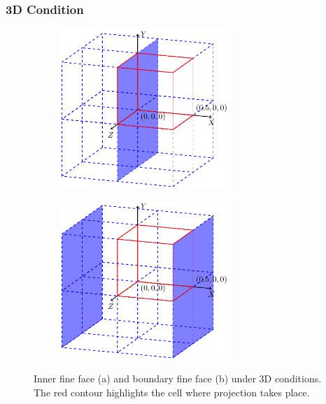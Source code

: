 \subsubsection{3D Condition}
\begin{figure}[ht]
    \centering
    \begin{subfigure}[b]{0.45\textwidth}
        \centering
        \includegraphics[height=6cm]{./image/embed-tree-h/fs_3D3.pdf}
        \subcaption{}
        \label{fig:embed-tree-3Dinner}
    \end{subfigure}
    \begin{subfigure}[b]{0.45\textwidth}
        \centering
        \includegraphics[height=6cm]{./image/embed-tree-h/fs_3D4.pdf}
        \subcaption{}
        \label{fig:embed-tree-3Dboundary}
    \end{subfigure}
    \caption{Inner fine face (a) and boundary fine face (b) under 3D conditions. The red contour highlights the cell where projection takes place.}
    \label{fig:embed-tree-3Dface}
\end{figure}

